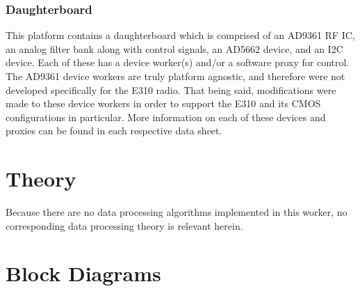 \documentclass{article}
\begin{document}
\subsubsection*{Daughterboard}
\begin{flushleft}
This platform contains a daughterboard which is comprised of an AD9361 RF IC, an analog filter bank along with control signals, an AD5662 device, and an I2C device. Each of these has a device worker(s) and/or a software proxy for control. The AD9361 device workers are truly platform agnostic, and therefore were not developed specifically for the E310 radio. That being said, modifications were made to these device workers in order to support the E310 and its CMOS configurations in particular. More information on each of these devices and proxies can be found in each respective data sheet.

\end{flushleft}

\section*{Theory}
Because there are no data processing algorithms implemented in this worker, no corresponding data processing theory is relevant herein.

\section*{Block Diagrams}
\end{document}
